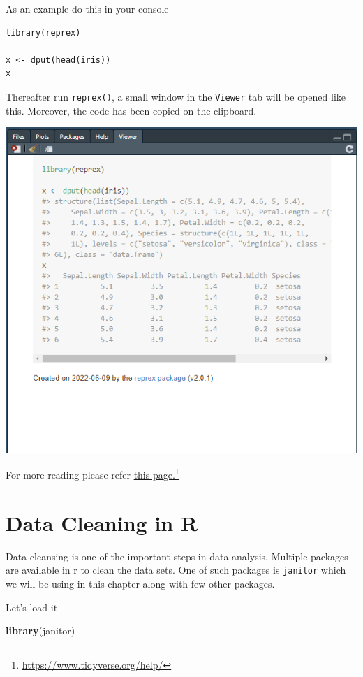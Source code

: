 \documentclass[
]{book}
\newenvironment{Shaded}{\begin{snugshade}}{\end{snugshade}}
\newcommand{\FunctionTok}[1]{\textcolor[rgb]{0.13,0.29,0.53}{\textbf{#1}}}
\newcommand{\NormalTok}[1]{#1}
\begin{document}
As an example do this in your console

\begin{verbatim}
library(reprex)

x <- dput(head(iris))
x
\end{verbatim}

Thereafter run \texttt{reprex()}, a small window in the \texttt{Viewer} tab will be opened like this. Moreover, the code has been copied on the clipboard.

\includegraphics{images/reprex.png}

For more reading please refer \href{https://www.tidyverse.org/help/}{this page.}\footnote{\url{https://www.tidyverse.org/help/}}

\hypertarget{data-cleaning-in-r}{%
\chapter{Data Cleaning in R}\label{data-cleaning-in-r}}

Data cleansing is one of the important steps in data analysis. Multiple packages are available in r to clean the data sets. One of such packages is \texttt{janitor} which we will be using in this chapter along with few other packages.

Let's load it

\begin{Shaded}
\begin{Highlighting}[]
\FunctionTok{library}\NormalTok{(janitor)}
\end{Highlighting}
\end{Shaded}
\end{document}
